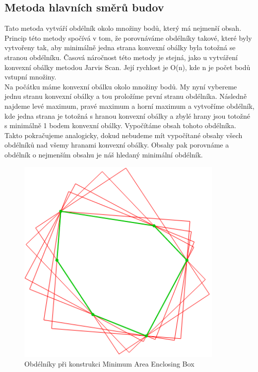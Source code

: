 \documentclass[a4paper,11pt,twoside]{article}
\begin{document}
\subsection{Metoda hlavních směrů budov}
Tato metoda vytváří obdélník okolo množiny bodů, který má nejmenší obsah. Princip této metody spočívá v tom, že porovnáváme obdélníky takové, které byly vytvořeny tak, aby minimálně jedna strana konvexní obálky byla totožná se stranou obdélníku.
Časová náročnost této metody je stejná, jako u vytváření konvexní obálky metodou Jarvis Scan. Její rychlost je O(n), kde n je počet bodů vstupní množiny. \\
\indent Na počátku máme konvexní obálku okolo množiny bodů. My nyní vybereme jednu stranu konvexní obálky a tou proložíme první stranu obdélníka. Následně najdeme levé maximum, pravé maximum a horní maximum a vytvoříme obdélník, kde jedna strana je totožná s hranou konvexní obálky a zbylé hrany jsou totožné s minimálně 1 bodem konvexní obálky. Vypočítáme obsah tohoto obdélníka. Takto pokračujeme analogicky, dokud nebudeme mít vypočítané obsahy všech obdélníků nad všemy hranami konvexní obálky. Obsahy pak porovnáme a obdélník o nejmenším obsahu je náš hledaný minimální obdélník.


\vspace{0.2cm}
\begin{figure}[hbt!] 
\begin{center}
\includegraphics[width=10cm]{pictures/obdelniky.png} 
\caption[Obdélníky při konstrukci Minimum Area Enclosing Box]{Obdélníky při konstrukci Minimum Area Enclosing Box \cite{box}}
\label{fig:box}
\end{center}
\end{figure}
\vspace{-0.4cm}
\end{document}
